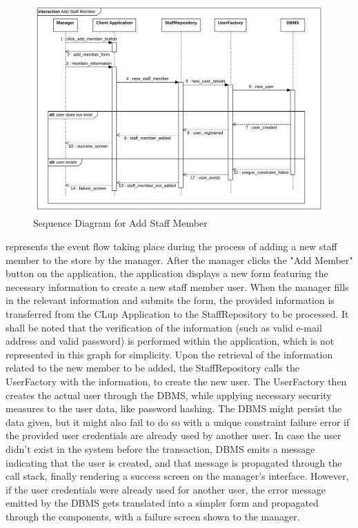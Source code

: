 \begin{figure}[H]
    \centering
    \includegraphics[height=0.4\textwidth]{Images/SequenceDiagrams/AddStaffMember.png}
    \caption{Sequence Diagram for Add Staff Member}
    \label{fig:SDAddStaffMember}
\end{figure}
 represents the event flow taking place during the process of adding a new staff member to the store by the manager.
After the manager clicks the "Add Member" button on the application, the application displays a new form featuring the necessary information to create a new staff member user.
When the manager fills in the relevant information and submits the form, the provided information is transferred from the CLup Application to the StaffRepository to be processed.
It shall be noted that the verification of the information (such as valid e-mail address and valid password) is performed within the application, which is not represented in this graph for simplicity.
Upon the retrieval of the information related to the new member to be added, the StaffRepository calls the UserFactory with the information, to create the new user.
The UserFactory then creates the actual user through the DBMS, while applying necessary security measures to the user data, like password hashing.
The DBMS might persist the data given, but it might also fail to do so with a unique constraint failure error if the provided user credentials are already used by another user.
In case the user didn't exist in the system before the transaction, DBMS emits a message indicating that the user is created, and that message is propagated through the call stack, finally rendering a success screen on the manager's interface.
However, if the user credentials were already used for another user, the error message emitted by the DBMS gets translated into a simpler form and propagated through the components, with a failure screen shown to the manager.

